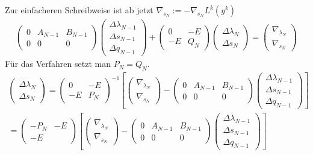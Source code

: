   Zur einfacheren Schreibweise ist ab jetzt $ \nabla_{s_{N}} := -\nabla_{s_{N}} L^{k}(y^{k}) $
  \begin{align*}
  \begin{pmatrix}
   0  & A_{N-1} & B_{N-1} \\
   0  & 0  &  0 
  \end{pmatrix}
  \begin{pmatrix}
  \Delta \lambda_{N-1} \\
  \Delta s_{N-1} \\
  \Delta q_{N-1} 
  \end{pmatrix} 
  +
  \begin{pmatrix}
   0 & -E \\
   -E  &  Q_N 
  \end{pmatrix}
  \begin{pmatrix}
  \Delta \lambda_{N} \\
  \Delta s_{N} 
  \end{pmatrix} 
  = 
  \begin{pmatrix}
  \nabla_{\lambda_{N}} \\ 
  \nabla_{s_{N}} 
  \end{pmatrix}
  \end{align*}
  Für das Verfahren setzt man $ P_N = Q_N $.
  \begin{align*}
  \begin{pmatrix}
  \Delta \lambda_{N} \\
  \Delta s_{N} 
  \end{pmatrix}
  =
  \begin{pmatrix}
   0 & -E \\
   -E  &  P_N 
  \end{pmatrix}^{-1}
  \left[ 
  \begin{pmatrix}
  \nabla_{\lambda_{N}} \\ 
  \nabla_{s_{N}} 
  \end{pmatrix}
  -
  \begin{pmatrix}
   0  & A_{N-1} & B_{N-1} \\
   0  & 0  &  0 
  \end{pmatrix}
  \begin{pmatrix}
  \Delta \lambda_{N-1} \\
  \Delta s_{N-1} \\
  \Delta q_{N-1} 
  \end{pmatrix} \right] \\
  =
  \begin{pmatrix}
   -P_N & -E \\
   -E  &   
  \end{pmatrix}
  \left[ 
  \begin{pmatrix}
  \nabla_{\lambda_{N}} \\ 
  \nabla_{s_{N}} 
  \end{pmatrix}
  -
  \begin{pmatrix}
   0  & A_{N-1} & B_{N-1} \\
   0  & 0  &  0 
  \end{pmatrix}
  \begin{pmatrix}
  \Delta \lambda_{N-1} \\
  \Delta s_{N-1} \\
  \Delta q_{N-1} 
  \end{pmatrix} \right] 
  \end{align*}
